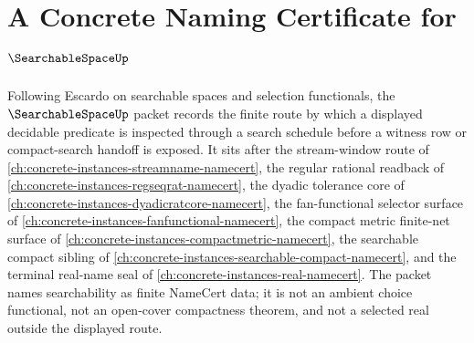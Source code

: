 \chapter{A Concrete Naming Certificate for $\SearchableSpaceUp$}
\label{ch:concrete-instances-searchable-space-namecert}

Following Escardo on searchable spaces and selection functionals, the $\SearchableSpaceUp$ packet records the finite route by which a displayed decidable predicate is inspected through a search schedule before a witness row or compact-search handoff is exposed. It sits after the stream-window route of \autoref{ch:concrete-instances-streamname-namecert}, the regular rational readback of \autoref{ch:concrete-instances-regseqrat-namecert}, the dyadic tolerance core of \autoref{ch:concrete-instances-dyadicratcore-namecert}, the fan-functional selector surface of \autoref{ch:concrete-instances-fanfunctional-namecert}, the compact metric finite-net surface of \autoref{ch:concrete-instances-compactmetric-namecert}, the searchable compact sibling of \autoref{ch:concrete-instances-searchable-compact-namecert}, and the terminal real-name seal of \autoref{ch:concrete-instances-real-namecert}. The packet names searchability as finite NameCert data; it is not an ambient choice functional, not an open-cover compactness theorem, and not a selected real outside the displayed route.

